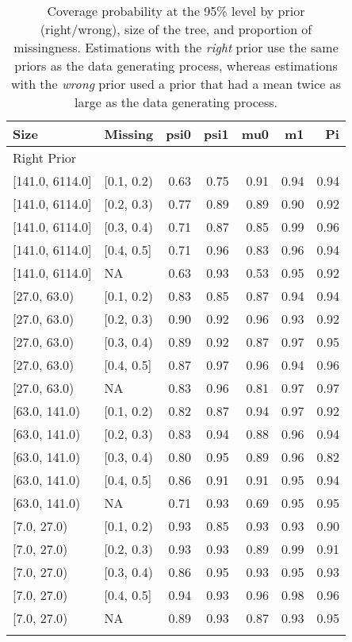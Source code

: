 \begin{table}[ht]
\centering
\begin{tabular}{llrrrrr}
  \toprule
Size & Missing & psi0 & psi1 & mu0 & m1 & Pi \\ 
  \midrule
\multicolumn{7}{l}{Right Prior}\\
{[141.0, 6114.0]} & {[0.1, 0.2)} & 0.63 & 0.75 & 0.91 & 0.94 & 0.94 \\ 
  {[141.0, 6114.0]} & {[0.2, 0.3)} & 0.77 & 0.89 & 0.89 & 0.90 & 0.92 \\ 
  {[141.0, 6114.0]} & {[0.3, 0.4)} & 0.71 & 0.87 & 0.85 & 0.99 & 0.96 \\ 
  {[141.0, 6114.0]} & {[0.4, 0.5]} & 0.71 & 0.96 & 0.83 & 0.96 & 0.94 \\ 
  {[141.0, 6114.0]} & {NA} & 0.63 & 0.93 & 0.53 & 0.95 & 0.92 \\ 
  {[27.0, 63.0)} & {[0.1, 0.2)} & 0.83 & 0.85 & 0.87 & 0.94 & 0.94 \\ 
  {[27.0, 63.0)} & {[0.2, 0.3)} & 0.90 & 0.92 & 0.96 & 0.93 & 0.92 \\ 
  {[27.0, 63.0)} & {[0.3, 0.4)} & 0.89 & 0.92 & 0.87 & 0.97 & 0.95 \\ 
  {[27.0, 63.0)} & {[0.4, 0.5]} & 0.87 & 0.97 & 0.96 & 0.94 & 0.96 \\ 
  {[27.0, 63.0)} & {NA} & 0.83 & 0.96 & 0.81 & 0.97 & 0.97 \\ 
  {[63.0, 141.0)} & {[0.1, 0.2)} & 0.82 & 0.87 & 0.94 & 0.97 & 0.92 \\ 
  {[63.0, 141.0)} & {[0.2, 0.3)} & 0.83 & 0.94 & 0.88 & 0.96 & 0.94 \\ 
  {[63.0, 141.0)} & {[0.3, 0.4)} & 0.80 & 0.95 & 0.89 & 0.96 & 0.82 \\ 
  {[63.0, 141.0)} & {[0.4, 0.5]} & 0.86 & 0.91 & 0.91 & 0.95 & 0.94 \\ 
  {[63.0, 141.0)} & {NA} & 0.71 & 0.93 & 0.69 & 0.95 & 0.95 \\ 
  {[7.0, 27.0)} & {[0.1, 0.2)} & 0.93 & 0.85 & 0.93 & 0.93 & 0.90 \\ 
  {[7.0, 27.0)} & {[0.2, 0.3)} & 0.93 & 0.93 & 0.89 & 0.99 & 0.91 \\ 
  {[7.0, 27.0)} & {[0.3, 0.4)} & 0.86 & 0.95 & 0.93 & 0.95 & 0.93 \\ 
  {[7.0, 27.0)} & {[0.4, 0.5]} & 0.94 & 0.93 & 0.96 & 0.98 & 0.96 \\ 
  {[7.0, 27.0)} & {NA} & 0.89 & 0.93 & 0.87 & 0.93 & 0.95 \\ 
   \bottomrule
\multicolumn{7}{l}{}\\
\end{tabular}
\caption{Coverage probability at the 95\% level by prior (right/wrong), size of the tree, and proportion of missingness.  Estimations with the \emph{right} prior use the same priors as the data generating process, whereas estimations with the \emph{wrong} prior used a prior that had a mean twice as large as the data generating process.} 
\label{tab:coverage95-method-size-missigness}
\end{table}
